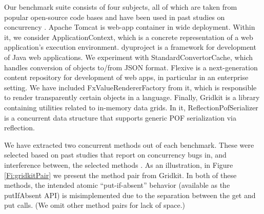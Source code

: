 %
Our benchmark suite consists of four subjects, all of which are taken from popular open-source code bases and have been used in past studies on concurrency \cite{oopsla/ShachamBASVY11,issta/ShachamYGABSV14}.
	Apache Tomcat is web-app container in wide deployment. Within it, we consider {\sf ApplicationContext}, which is a concrete representation of a web application's execution environment.
	dyuproject is a framework for development of Java web applications. We experiment with {\sf StandardConvertorCache}, which handles conversion of objects to/from JSON format.
	Flexive is a next-generation content repository for development of web apps, in particular in an enterprise setting. We have included {\sf FxValueRendererFactory} from it, which is responsible to render transparently certain objects in a language.
	Finally, Gridkit is a library containing utilities related to in-memory data grids. In it, {\sf ReflectionPofSerializer} is a concurrent data structure that supports generic POF serialization via reflection.

We have extracted two concurrent methods out of each benchmark. These were selected based on past studies that report on concurrency bugs in, and interference between, the selected methods \cite{oopsla/ShachamBASVY11}. 
%
As an illustration, in Figure \ref{Fi:gridkitPair} we present the method pair from Gridkit. In both of these methods, the intended atomic ``put-if-absent'' behavior (available as the {\sf putIfAbsent} API) is misimplemented due to the separation between the {\sf get} and {\sf put} calls. (We omit other method pairs for lack of space.)

